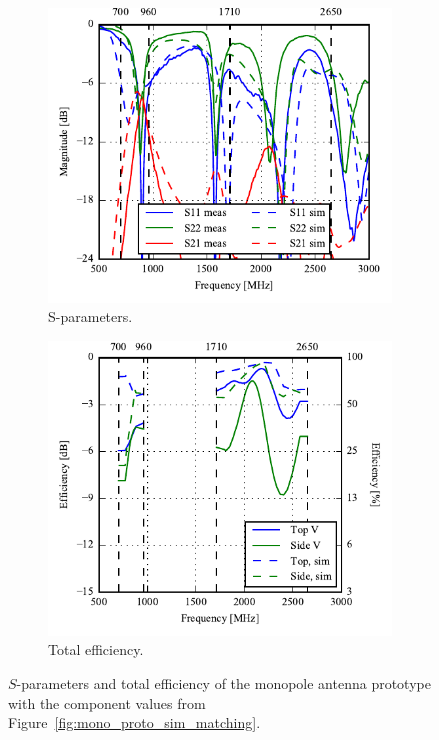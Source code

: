 \begin{figure}[htbp]
    \centering
    \begin{subfigure}{0.49\linewidth}
        \includegraphics{img/tech_sol/monopole/prototype_v2/meas_sim_sparams.pdf}
        \caption{S-parameters.}
    \end{subfigure}
    \hfill
    \begin{subfigure}{0.49\linewidth}
        \includegraphics{img/tech_sol/monopole/prototype_v2/meas_sim_efficiency.pdf}
        \caption{Total efficiency.}
    \end{subfigure}
    \caption{$S$-parameters and total efficiency of the monopole antenna prototype with the component values from Figure~\ref{fig:mono_proto_sim_matching}.}
    \label{fig:mono_proto_sparam_eff}
\end{figure}

